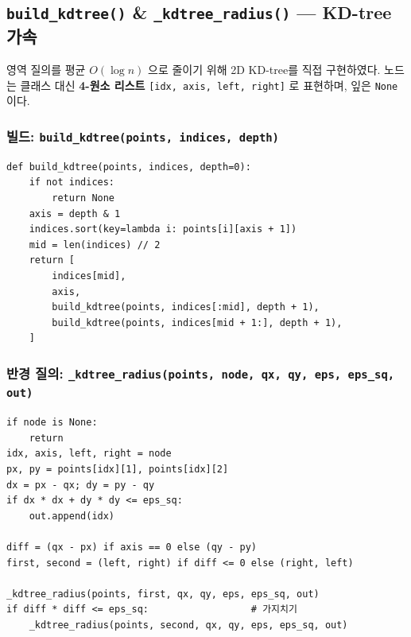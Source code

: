 \documentclass[12pt, a4paper]{article}
\begin{document}
\subsection{\texttt{build\_kdtree()} \& \texttt{\_kdtree\_radius()} --- KD-tree 가속}

영역 질의를 평균 $O(\log n)$ 으로 줄이기 위해 2D KD-tree를 직접 구현하였다. 노드는 클래스 대신 \textbf{4-원소 리스트} \texttt{[idx, axis, left, right]} 로 표현하며, 잎은 \texttt{None} 이다.

\subsubsection*{빌드: \texttt{build\_kdtree(points, indices, depth)}}

\begin{verbatim}
def build_kdtree(points, indices, depth=0):
    if not indices:
        return None
    axis = depth & 1
    indices.sort(key=lambda i: points[i][axis + 1])
    mid = len(indices) // 2
    return [
        indices[mid],
        axis,
        build_kdtree(points, indices[:mid], depth + 1),
        build_kdtree(points, indices[mid + 1:], depth + 1),
    ]
\end{verbatim}

\subsubsection*{반경 질의: \texttt{\_kdtree\_radius(points, node, qx, qy, eps, eps\_sq, out)}}

\begin{verbatim}
if node is None:
    return
idx, axis, left, right = node
px, py = points[idx][1], points[idx][2]
dx = px - qx; dy = py - qy
if dx * dx + dy * dy <= eps_sq:
    out.append(idx)

diff = (qx - px) if axis == 0 else (qy - py)
first, second = (left, right) if diff <= 0 else (right, left)

_kdtree_radius(points, first, qx, qy, eps, eps_sq, out)
if diff * diff <= eps_sq:                  # 가지치기
    _kdtree_radius(points, second, qx, qy, eps, eps_sq, out)
\end{verbatim}
\end{document}
